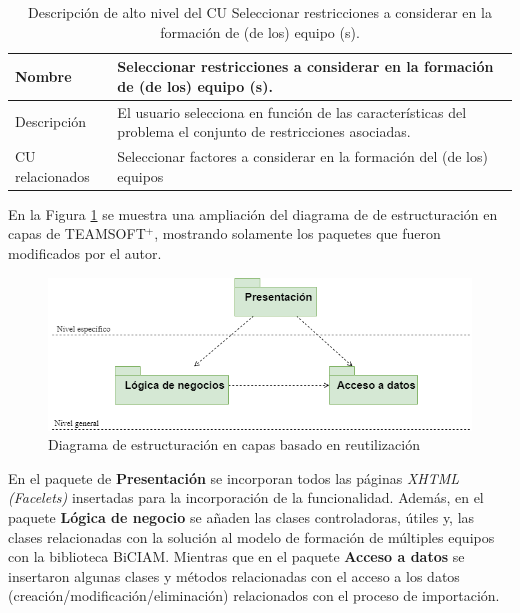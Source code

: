 \begin{table}[H]
	\centering
	\caption{Descripción de alto nivel del CU  Seleccionar restricciones a considerar en la formación de (de los) equipo (s).} \label{table:descripcion-alto-nivel-restricciones}
		\begin{tabular}{ | l | p{10cm} |}
			\toprule
			Nombre          &  Seleccionar restricciones a considerar en la formación de (de los) equipo (s).                                                                                                                      \\ \midrule
			Descripción     & El usuario selecciona en función de las características del problema el conjunto de restricciones asociadas. \\ \hline
			CU relacionados & Seleccionar factores a considerar en la formación del (de los) equipos \\ \bottomrule
		\end{tabular}
\end{table}


En la Figura \ref{fig:diagrama-paquetes-modificado} se muestra una ampliación del diagrama de de estructuración en capas de TEAMSOFT$^+$, mostrando solamente los paquetes que  fueron modificados por el autor.

\begin{figure}[H]
	\centering
	\includegraphics[width=.7\textwidth]{figuras/diagrama-paquetes-modificado.png}
	\caption{Diagrama de estructuración en capas basado en reutilización} \label{fig:diagrama-paquetes-modificado}
\end{figure}

En el paquete de \textbf{Presentación} se incorporan todos las páginas \textit{XHTML (Facelets)} insertadas para la incorporación de la funcionalidad. Además, en el paquete \textbf{Lógica de negocio} se añaden las clases controladoras, útiles y, las clases relacionadas con la solución al modelo de formación de múltiples equipos con la biblioteca BiCIAM. Mientras que en el paquete \textbf{Acceso a datos} se insertaron algunas clases y métodos relacionadas con el acceso a los datos (creación/modificación/eliminación) relacionados con el proceso de importación.\\

